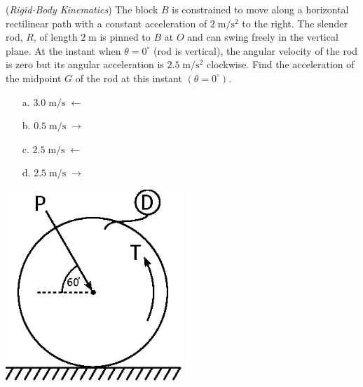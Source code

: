 \documentclass[addpoints, 12pt]{exam}
\begin{document}
\begin{questions}
\begin{minipage}{0.5\textwidth}
\question(\textit{Rigid-Body Kinematics})
The block $B$ is constrained to move along a horizontal rectilinear path with a 
constant acceleration of $2\; \unit{\meter\per\second\squared}$ to the right. 
The slender rod, $R$, of length $2\; \unit{\meter}$ is pinned to $B$ at $O$ and 
can swing freely in the vertical plane. At the instant when $\theta = 0^\circ$ 
(rod is vertical), the angular velocity of the rod is zero but its angular 
acceleration is $2.5 \; \unit{\meter\per\second\squared}$ clockwise. Find the 
acceleration of the midpoint $G$ of the rod at this instant $(\theta =
0^\circ)$. \\[0.5ex]

\begin{minipage}{0.45\textwidth}
    \begin{center}
    \begin{itemize}
        \setlength\itemsep{-0.4em}
        \item[a.] $3.0 \; \unit{\meter\per\second} \; \leftarrow$
        \item[b.] $0.5 \; \unit{\meter\per\second} \; \rightarrow$
    \end{itemize}
    \end{center}
\end{minipage}
\begin{minipage}{0.45\textwidth}
    \begin{center}
    \begin{itemize}
        \setlength\itemsep{-0.4em}
        \item[c.] $2.5 \; \unit{\meter\per\second} \; \leftarrow$
        \item[d.] $2.5 \; \unit{\meter\per\second} \; \rightarrow$
    \end{itemize}
    \end{center}
\end{minipage}

\end{minipage}
%
\begin{minipage}{0.5\textwidth}
    \centering
    \includegraphics[width=0.5\textwidth,valign=c]{./figures/question6.eps}
\end{minipage}



\end{questions}
\end{document}
